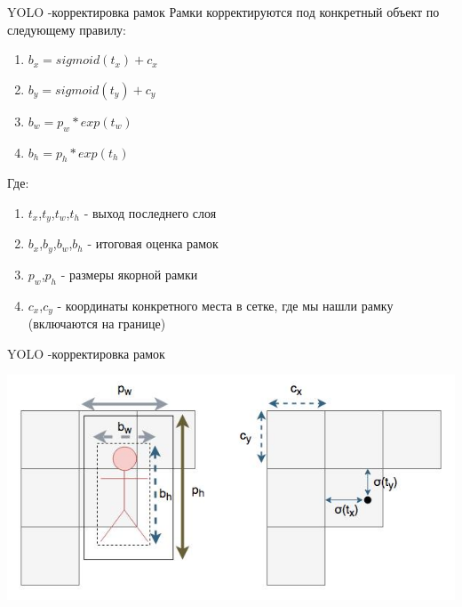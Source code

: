 \documentclass[notes,12pt, aspectratio=169]{beamer}
\begin{document}
\begin{frame}{YOLO -корректировка рамок}
Рамки корректируются под конкретный объект по следующему правилу:
\begin{enumerate}
	\item $b_x = sigmoid(t_x)+c_x$
	\item $b_y = sigmoid(t_y)+c_y$
	\item $b_w = p_w * exp(t_w)$
	\item $b_h = p_h * exp(t_h)$
\end{enumerate}
 Где:
 \begin{enumerate}
 	\item $t_x$,$t_y$,$t_w$,$t_h$ - выход последнего слоя
 	\item $b_x$,$b_y$,$b_w$,$b_h$ - итоговая оценка рамок
 	\item $p_w$,$p_h$ - размеры якорной рамки
 	\item $c_x$,$c_y$ - координаты конкретного места в сетке, где мы нашли рамку (включаются на границе)
 \end{enumerate}
\end{frame}

\begin{frame}{YOLO -корректировка рамок}
\begin{center}
 \includegraphics[width=1\linewidth]{corrections.jpg}
\end{center}
\end{frame}
\end{document}
